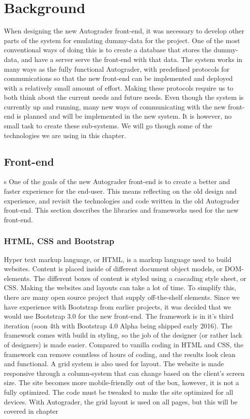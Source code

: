 \chapter{Background}
When designing the new Autograder front-end, it was necessary to develop other parts of the system for emulating dummy-data for the project. One of the most conventional ways of doing this is to create a database that stores the dummy-data, and have a server serve the front-end with that data. The system works in many ways as the fully functional Autograder, with predefined protocols for communications so that the new front-end can be implemented and deployed with a relatively small amount of effort. Making these protocols require us to both think about the current needs and future needs. Even though the system is currently up and running, many new ways of communicating with the new front-end is planned and will be implemented in the new system. It is however, no small task to create these sub-systems. We will go though some of the technologies we are using in this chapter.

\section{Front-end}s
One of the goals of the new Autograder front-end is to create a better and faster experience for the end-user. This means reflecting on the old design and experience, and revisit the technologies and code written in the old Autograder front-end. This section describes the libraries and frameworks used for the new front-end.

\subsection{HTML, CSS and Bootstrap}
Hyper text markup language, or HTML, is a markup language used to build websites. Content is placed inside of different document object models, or DOM-elements. The different boxes of content is styled using a cascading style sheet, or CSS. Making the websites and layouts can take a lot of time. To simplify this, there are many open source project that supply off-the-shelf elements. Since we have experience with Bootstrap from earlier projects, it was decided that we would use Bootstrap 3.0 for the new front-end. The framework is in it's third iteration (soon 4th with Bootstrap 4.0 Alpha being shipped early 2016). The framework comes with build in styling, so the job of the designer (or rather lack of designers) is made easier. Compared to vanilla coding in HTML and CSS, the framework can remove countless of hours of coding, and the results look clean and functional. A grid system is also used for layout. The website is made responsive through a column-system that can change based on the client's screen size. The site becomes more mobile-friendly out of the box, however, it is not a fully optimized. The code must be tweaked to make the site optimized for all devices. With Autograder, the grid layout is used on all pages, but this will be covered in chapter 

